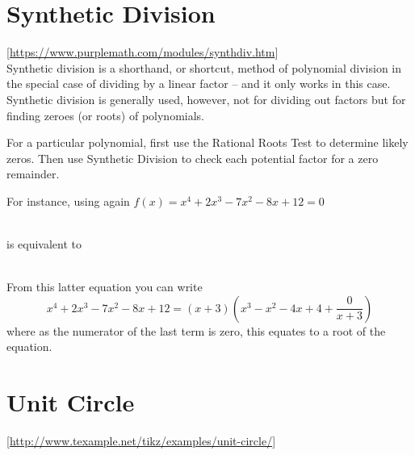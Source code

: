 \documentclass[a4paper,twoside=off]{scrbook}
\theoremstyle{definition}
\begin{document}
\section{Synthetic Division}
[\url{https://www.purplemath.com/modules/synthdiv.htm}] \\
Synthetic division is a shorthand, or shortcut, method of polynomial division in the special case of dividing by a linear factor -- and it only works in this case. Synthetic division is generally used, however, not for dividing out factors but for finding zeroes (or roots) of polynomials.

For a particular polynomial, first use the Rational Roots Test to determine likely zeros.  Then use Synthetic Division to check each potential factor for a zero remainder.

For instance, using again $f(x) = x^{4} + 2x^{3} - 7x^{2} - 8x + 12 = 0$
\medskip

 \\
\medskip
is equivalent to \\
\medskip
{}\\
\medskip

From this latter equation you can write
\begin{equation}
    x^{4} + 2x^{3} - 7x^{2} - 8x + 12 = (x + 3) \left( x^{3} - x^{2} - 4x + 4 + \frac{0}{x+3} \right)
\end{equation}
where as the numerator of the last term is zero, this equates to a root of the equation.

\pagebreak
\section{Unit Circle}
[\url{http://www.texample.net/tikz/examples/unit-circle/}]
\end{document}
